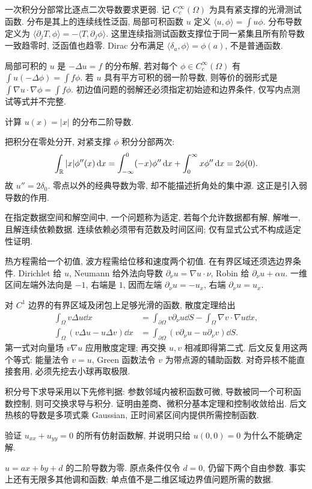 一次积分分部常比逐点二次导数要求更弱. 记 $C_c^\infty(\Omega)$ 为具有紧支撑的光滑测试函数. 分布是其上的连续线性泛函, 局部可积函数 $u$ 定义 $\langle u,\phi\rangle=\int u\phi$. 分布导数定义为 $\langle\partial_j T,\phi\rangle=-\langle T,\partial_j\phi\rangle$. 这里连续指测试函数支撑位于同一紧集且所有阶导数一致趋零时, 泛函值也趋零. Dirac 分布满足 $\langle\delta_a,\phi\rangle=\phi(a)$, 不是普通函数.
\begin{definition}
局部可积的 $u$ 是 $-\Delta u=f$ 的分布解, 若对每个 $\phi\in C_c^\infty(\Omega)$ 有 $\int u(-\Delta\phi)=\int f\phi$. 若 $u$ 具有平方可积的弱一阶导数, 则等价的弱形式是 $\int\nabla u\cdot\nabla\phi=\int f\phi$. 初边值问题的弱解还必须指定初始迹和边界条件, 仅写内点测试等式并不完整.
\end{definition}
\begin{example}
计算 $u(x)=|x|$ 的分布二阶导数.
\end{example}
\begin{solution}
把积分在零处分开, 对紧支撑 $\phi$ 积分分部两次:
\[
\int_\mathbb R |x|\phi''(x)\,\mathrm d x
=\int_{-\infty}^0(-x)\phi''\,\mathrm d x+\int_0^\infty x\phi''\,\mathrm d x=2\phi(0).
\]
故 $u''=2\delta_0$. 零点以外的经典导数为零, 却不能描述折角处的集中源. 这正是引入弱导数的作用.
\end{solution}
\begin{definition}
在指定数据空间和解空间中, 一个问题称为适定, 若每个允许数据都有解, 解唯一, 且解连续依赖数据. 连续依赖必须带有范数及时间区间; 仅有显式公式不构成适定性证明.
\end{definition}
热方程需给一个初值, 波方程需给位移和速度两个初值. 在有界区域还须选边界条件. Dirichlet 给 $u$, Neumann 给外法向导数 $\partial_\nu u=\nabla u\cdot\nu$, Robin 给 $\partial_\nu u+\alpha u$. 一维区间左端外法向是 $-1$, 右端是 $1$, 因而左端 $\partial_\nu u=-u_x$, 右端 $\partial_\nu u=u_x$.

对 $C^1$ 边界的有界区域及闭包上足够光滑的函数, 散度定理给出
\begin{align}
\int_\Omega v\Delta u\dd x
&=\int_{\partial\Omega}v\partial_\nu u\dd S-\int_\Omega\nabla v\cdot\nabla u\dd x,\label{eq:greenone}\\
\int_\Omega(v\Delta u-u\Delta v)\dd x
&=\int_{\partial\Omega}(v\partial_\nu u-u\partial_\nu v)\dd S.\label{eq:greentwo}
\end{align}
第一式对向量场 $v\nabla u$ 应用散度定理; 再交换 $u,v$ 相减即得第二式. 后文反复用这两个等式: 能量法令 $v=u$, Green 函数法令 $v$ 为带点源的辅助函数. 对奇异核不能直接套用, 必须先挖去小球再取极限.

积分号下求导采用以下先修判据: 参数邻域内被积函数可微, 导数被同一个可积函数控制, 则可交换求导与积分. 证明由差商、微积分基本定理和控制收敛给出. 后文热核的导数是多项式乘 Gaussian, 正时间紧区间内提供所需控制函数.
\begin{exercise}
验证 $u_{xx}+u_{yy}=0$ 的所有仿射函数解, 并说明只给 $u(0,0)=0$ 为什么不能确定解.
\end{exercise}
\begin{solution}
$u=ax+by+d$ 的二阶导数为零. 原点条件仅令 $d=0$, 仍留下两个自由参数. 事实上还有无限多其他调和函数; 单点值不是二维区域边界值问题所需的数据.
\end{solution}
